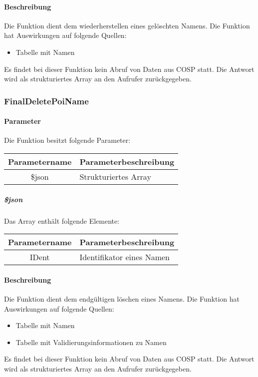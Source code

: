 \paragraph{Beschreibung} Die Funktion dient dem wiederherstellen eines gelöschten Namens. Die Funktion hat Auswirkungen auf folgende Quellen:
\begin{itemize}
	\item Tabelle mit Namen
\end{itemize}
Es findet bei dieser Funktion kein Abruf von Daten aus {\glqq COSP\grqq} statt. Die Antwort wird als strukturiertes Array an den Aufrufer zurückgegeben.
\subsubsection{FinalDeletePoiName}
\paragraph{Parameter} Die Funktion besitzt folgende Parameter:
\begin{table}[H]
	\begin{tabular}{|c|p{11cm}|}
		\hline
		\textbf{Parametername} & \textbf{Parameterbeschreibung} \\ \hline
		\$json & Strukturiertes Array \\ \hline
	\end{tabular}
\end{table}
\subparagraph{\$json}Das Array enthält folgende Elemente:
\begin{table}[H]
	\begin{tabular}{|c|p{11cm}|}
		\hline
		\textbf{Parametername} & \textbf{Parameterbeschreibung} \\ \hline
		IDent & Identifikator eines Namen \\ \hline
	\end{tabular}
\end{table}
\paragraph{Beschreibung} Die Funktion dient dem endgültigen löschen eines Namens. Die Funktion hat Auswirkungen auf folgende Quellen:
\begin{itemize}
	\item Tabelle mit Namen
	\item Tabelle mit Validierungsinformationen zu Namen
\end{itemize}
Es findet bei dieser Funktion kein Abruf von Daten aus {\glqq COSP\grqq} statt. Die Antwort wird als strukturiertes Array an den Aufrufer zurückgegeben.
